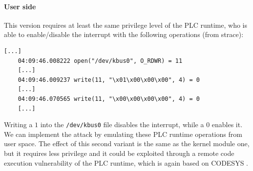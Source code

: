 \paragraph{User side}

This version requires at least the same privilege level of the PLC runtime, who is able to enable/disable the interrupt with the following operations (from strace):
\begin{Verbatim}[fontsize=\small]
	[...]
	04:09:46.008222 open("/dev/kbus0", O_RDWR) = 11
	[...]
	04:09:46.009237 write(11, "\x01\x00\x00\x00", 4) = 0
	[...]
	04:09:46.070565 write(11, "\x00\x00\x00\x00", 4) = 0
	[...]
\end{Verbatim}
Writing a $1$ into the \verb|/dev/kbus0| file disables the interrupt, while a $0$ enables it. We can implement the attack by emulating these PLC runtime operations from user space.
The effect of this second variant is the same as the kernel module one, but it requires less privilege and it could be exploited through a
remote code execution vulnerability of the PLC runtime, which is again based on CODESYS \cite{abb-codesys,codesys-server}.
